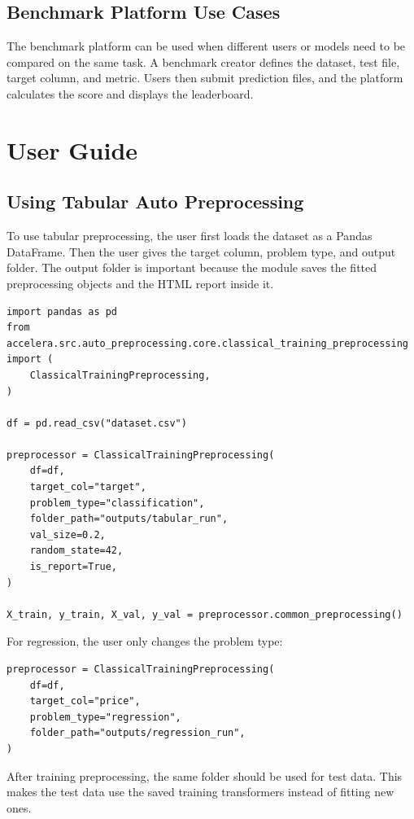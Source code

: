 \documentclass[12pt,a4paper]{report}
\begin{document}
\section{Benchmark Platform Use Cases}
The benchmark platform can be used when different users or models need to be
compared on the same task. A benchmark creator defines the dataset, test file,
target column, and metric. Users then submit prediction files, and the platform
calculates the score and displays the leaderboard.

\chapter{User Guide}
\section{Using Tabular Auto Preprocessing}
To use tabular preprocessing, the user first loads the dataset as a Pandas
DataFrame. Then the user gives the target column, problem type, and output
folder. The output folder is important because the module saves the fitted
preprocessing objects and the HTML report inside it.

\begin{lstlisting}[style=code,caption={Calling tabular training preprocessing}]
import pandas as pd
from accelera.src.auto_preprocessing.core.classical_training_preprocessing import (
    ClassicalTrainingPreprocessing,
)

df = pd.read_csv("dataset.csv")

preprocessor = ClassicalTrainingPreprocessing(
    df=df,
    target_col="target",
    problem_type="classification",
    folder_path="outputs/tabular_run",
    val_size=0.2,
    random_state=42,
    is_report=True,
)

X_train, y_train, X_val, y_val = preprocessor.common_preprocessing()
\end{lstlisting}

For regression, the user only changes the problem type:

\begin{lstlisting}[style=code,caption={Changing tabular preprocessing to regression}]
preprocessor = ClassicalTrainingPreprocessing(
    df=df,
    target_col="price",
    problem_type="regression",
    folder_path="outputs/regression_run",
)
\end{lstlisting}

After training preprocessing, the same folder should be used for test data.
This makes the test data use the saved training transformers instead of fitting
new ones.
\end{document}

